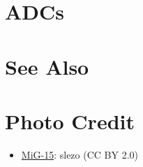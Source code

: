 \section{ADCs}
\begin{adclist}
\end{adclist}

\section{See Also}
\begin{typelist}
\end{typelist}

\section{Photo Credit}
\begin{itemize}\raggedright
    \item \href{https://commons.wikimedia.org/wiki/File:MiG-15_(52544074366).jpg}{MiG-15}: slezo (CC BY 2.0)
\end{itemize}
